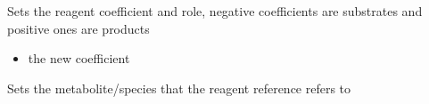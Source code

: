\documentclass[letterpaper,10pt,english]{sphinxmanual}
\begin{document}
\begin{fulllineitems}
\begin{fulllineitems}
\end{fulllineitems}


\begin{fulllineitems}
\label{\detokenize{modules_doc:cbmpy.CBModel.Reagent.setCoefficient}}
\pysigstartsignatures
{}
\pysigstopsignatures
\sphinxAtStartPar
Sets the reagent coefficient and role, negative coefficients are substrates and positive ones are products
\begin{itemize}
\item {} 
\sphinxAtStartPar
{} the new coefficient

\end{itemize}

\end{fulllineitems}


\begin{fulllineitems}
\label{\detokenize{modules_doc:cbmpy.CBModel.Reagent.setSpecies}}
\pysigstartsignatures
{}
\pysigstopsignatures
\sphinxAtStartPar
Sets the metabolite/species that the reagent reference refers to

\end{fulllineitems}


\end{fulllineitems}

\end{document}

